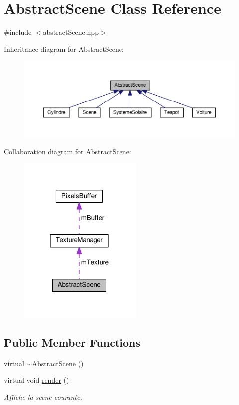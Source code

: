 \hypertarget{class_abstract_scene}{\section{Abstract\+Scene Class Reference}
\label{class_abstract_scene}
}


{\ttfamily \#include $<$abstract\+Scene.\+hpp$>$}



Inheritance diagram for Abstract\+Scene\+:
\nopagebreak
\begin{figure}[H]
\begin{center}
\leavevmode
\includegraphics[width=350pt]{class_abstract_scene__inherit__graph}
\end{center}
\end{figure}


Collaboration diagram for Abstract\+Scene\+:
\nopagebreak
\begin{figure}[H]
\begin{center}
\leavevmode
\includegraphics[width=169pt]{class_abstract_scene__coll__graph}
\end{center}
\end{figure}
\subsection*{Public Member Functions}
\begin{DoxyCompactItemize}
\item 
virtual \hyperlink{class_abstract_scene_a82b4811120763f71a5e81a9d72b339f3}{$\sim$\+Abstract\+Scene} ()
\item 
virtual void \hyperlink{class_abstract_scene_aaf2f4c7aa4a6401f66bed00a51d8e64f}{render} ()
\begin{DoxyCompactList}\small\item\em Affiche la scene courante. \end{DoxyCompactList}\end{DoxyCompactItemize}
